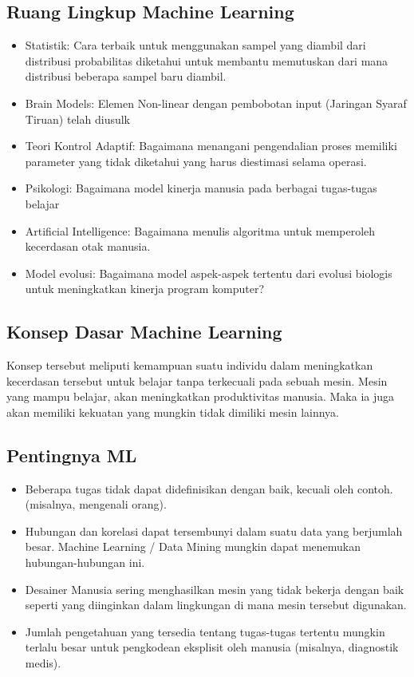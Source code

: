 \subsection{Ruang Lingkup Machine Learning}
\begin{itemize}
\item Statistik: Cara terbaik untuk menggunakan sampel yang diambil dari distribusi probabilitas diketahui untuk membantu memutuskan dari mana distribusi beberapa sampel baru diambil.
\item Brain Models: Elemen Non-linear dengan pembobotan input (Jaringan Syaraf Tiruan) telah diusulk
\item Teori Kontrol Adaptif: Bagaimana menangani pengendalian proses memiliki parameter yang tidak diketahui yang harus diestimasi selama operasi.
\item Psikologi: Bagaimana model kinerja manusia pada berbagai tugas-tugas belajar
\item Artificial Intelligence: Bagaimana menulis algoritma untuk memperoleh kecerdasan otak manusia.
\item Model evolusi: Bagaimana model aspek-aspek tertentu dari evolusi biologis untuk meningkatkan kinerja program komputer?
\end{itemize}

\subsection{Konsep Dasar Machine Learning}
Konsep tersebut meliputi kemampuan suatu individu dalam meningkatkan kecerdasan tersebut untuk belajar tanpa terkecuali pada sebuah mesin. Mesin yang mampu belajar, akan meningkatkan produktivitas manusia. Maka ia juga akan memiliki kekuatan yang mungkin tidak dimiliki mesin lainnya.
\subsection {Pentingnya ML}
\begin{itemize}
\item Beberapa tugas tidak dapat didefinisikan dengan baik, kecuali oleh contoh. (misalnya, mengenali orang). 
\item Hubungan dan korelasi dapat tersembunyi dalam suatu data yang berjumlah besar. Machine Learning / Data Mining mungkin dapat menemukan hubungan-hubungan ini.
\item Desainer Manusia sering menghasilkan mesin yang tidak bekerja dengan baik seperti yang diinginkan dalam lingkungan di mana mesin tersebut digunakan.
\item Jumlah pengetahuan yang tersedia tentang tugas-tugas tertentu mungkin terlalu besar untuk pengkodean eksplisit oleh manusia (misalnya, diagnostik medis).
\end{itemize}

